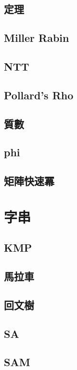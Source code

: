 \documentclass[a4paper,10pt,twocolumn,oneside]{article}
\begin{document}
\subsection{定理}

\subsection{Miller Rabin}

\subsection{NTT}

\subsection{Pollard's Rho}

\subsection{質數}

\subsection{phi}

\subsection{矩陣快速冪}

\section{字串}
\subsection{KMP}

\subsection{馬拉車}

\subsection{回文樹}

\subsection{SA}

\subsection{SAM}

\end{document}
